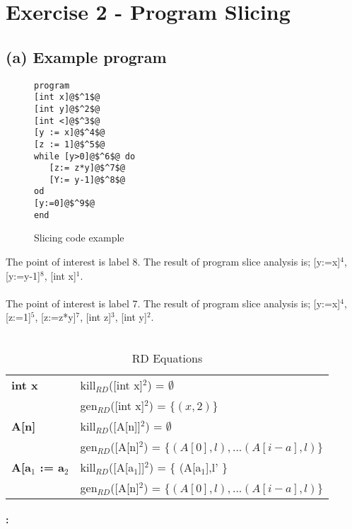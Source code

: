 \documentclass[12pt]{article}
\begin{document}
\section*{Exercise 2 - Program Slicing}

\subsection*{(a) Example program}
\begin{figure}
\begin{lstlisting}
program
[int x]@$^1$@
[int y]@$^2$@
[int <]@$^3$@
[y := x]@$^4$@
[z := 1]@$^5$@
while [y>0]@$^6$@ do
   [z:= z*y]@$^7$@
   [Y:= y-1]@$^8$@
od
[y:=0]@$^9$@
end
\end{lstlisting}
\label{source:example2}
\caption{Slicing code example}
\end{figure}

The point of interest is label 8.  The result of program slice analysis is; [y:=x]$^4$, [y:=y-1]$^8$, [int x]$^1$.\\\\

The point of interest is label 7.  The result of program slice analysis is; [y:=x]$^4$, [z:=1]$^5$, [z:=z*y]$^7$, [int z]$^3$, [int y]$^2$.\\\\



\begin{table}[h]
    \begin{tabular}{l | l }
    \textbf{int x} &  kill$_{RD}$([int x]$^2$) = $\emptyset$ \\
                   &  gen$_{RD}$([int x]$^2$) = $\{(x,2)\}$ \\
    \hline
    \textbf{A[n]} & kill$_{RD}$([A[n]]$^2$) = $\emptyset$\\
                  & gen$_{RD}$([A[n]$^2$) = $\{(A[0],l), ... (A[i-a],l)\}$ \\

    \hline
    \textbf{A[a$_1$ := a$_2$} & kill$_{RD}$([A[a$_1$]]$^2$) = \{ (A[a$_1$],l' \} \\
                              & gen$_{RD}$([A[n]$^2$) = $\{(A[0],l), ... (A[i-a],l)\}$ \\

    \end{tabular}
    \centering
	\caption{RD Equations}
	\label{table:rd_equations}
\end{table}


\paragraph*{:}
\end{document}
